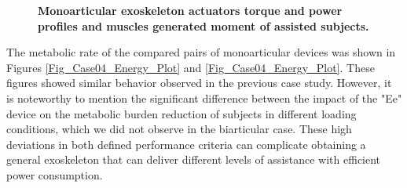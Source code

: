 \documentclass[10pt,letterpaper]{article}
\begin{document}
\begin{figure}[ht!]
	\centering
	\hfil
	\vspace{1mm}
	\caption{\small{\textbf{Monoarticular exoskeleton actuators torque and power profiles and muscles generated moment of assisted subjects.} }}
	\label{Fig_Case04_Profiles}
\end{figure}
The metabolic rate of the compared pairs of monoarticular devices was shown in Figures \ref{Fig_Case04_Energy_Plot} and \ref{Fig_Case04_Energy_Plot}. These figures showed similar behavior observed in the previous case study. However, it is noteworthy to mention the significant difference between the impact of the "Ee" device on the metabolic burden reduction of subjects in different loading conditions, which we did not observe in the biarticular case. These high deviations in both defined performance criteria can complicate obtaining a general exoskeleton that can deliver different levels of assistance with efficient power consumption.\\
\end{document}
